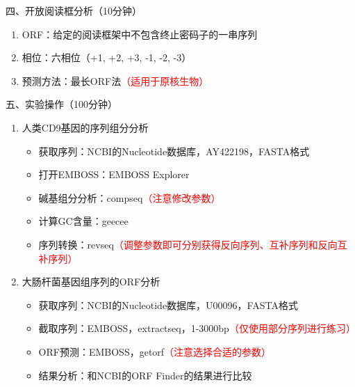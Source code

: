 \documentclass{TIJMUjiaoanSY}
\begin{document}
\noindent
四、开放阅读框分析（10分钟）
\begin{enumerate}
  \item ORF：给定的阅读框架中不包含终止密码子的一串序列
  \item 相位：六相位（+1, +2, +3, -1, -2, -3）
  \item 预测方法：最长ORF法\textcolor{red}{（适用于原核生物）}
\end{enumerate}


\vspace*{0.2cm}
\noindent
五、实验操作（100分钟）
\begin{enumerate}
  \item 人类CD9基因的序列组分分析
    \begin{itemize}
      \item 获取序列：NCBI的Nucleotide数据库，AY422198，FASTA格式
      \item 打开EMBOSS：EMBOSS Explorer
      \item 碱基组分分析：compseq\textcolor{red}{（注意修改参数）}
      \item 计算GC含量：geecee
      \item 序列转换：revseq\textcolor{red}{（调整参数即可分别获得反向序列、互补序列和反向互补序列）}
    \end{itemize}
  \item 大肠杆菌基因组序列的ORF分析
    \begin{itemize}
      \item 获取序列：NCBI的Nucleotide数据库，U00096，FASTA格式
      \item 截取序列：EMBOSS，extractseq，1-3000bp\textcolor{red}{（仅使用部分序列进行练习）}
      \item ORF预测：EMBOSS，getorf\textcolor{red}{（注意选择合适的参数）}
      \item 结果分析：和NCBI的ORF Finder的结果进行比较
    \end{itemize}
\end{enumerate}

\otherTail
\end{document}
